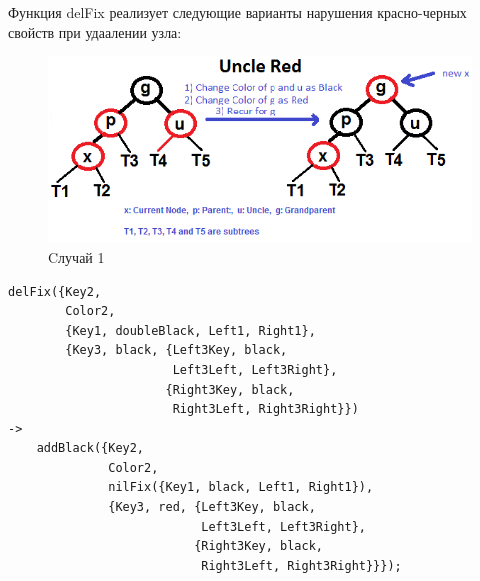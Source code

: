 			Функция delFix реализует следующие варианты нарушения красно-черных свойств 
			при удаалении узла:
			\begin{figure}[H]
				\centering
				\includegraphics[width=\textwidth]{img/tan-aus.png}
				\caption{Cлучай 1}
			\end{figure}
			\begin{lstlisting}
delFix({Key2, 														   				
        Color2, 													   				
        {Key1, doubleBlack, Left1, Right1}, 						   				
        {Key3, black, {Left3Key, black, 
                       Left3Left, Left3Right}, 	   				
                      {Right3Key, black, 
                       Right3Left, Right3Right}})
->																	   				
    addBlack({Key2, 												   				
              Color2, 												   				
              nilFix({Key1, black, Left1, Right1}), 				   				
              {Key3, red, {Left3Key, black, 
                           Left3Left, Left3Right},  				
                          {Right3Key, black, 
                           Right3Left, Right3Right}}});				
			\end{lstlisting}
			
